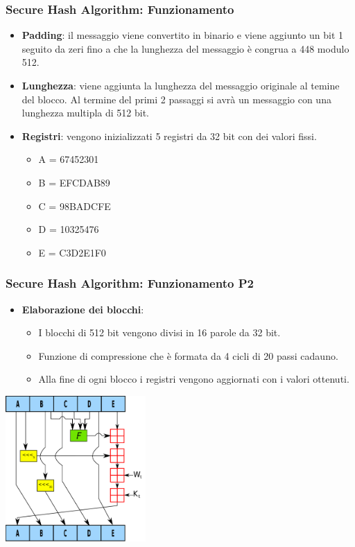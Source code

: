 \begin{frame}
\frametitle{Secure Hash Algorithm: Funzionamento}
\begin{itemize}
    \item \textbf{Padding}: il messaggio viene convertito in binario e viene aggiunto un bit 1 seguito da zeri fino a che la lunghezza del messaggio è congrua a 448 modulo 512.
    \item \textbf{Lunghezza}: viene aggiunta la lunghezza del messaggio originale al temine del blocco.
    Al termine del primi 2 passaggi si avrà un messaggio con una lunghezza multipla di 512 bit.
    \item \textbf{Registri}: vengono inizializzati 5 registri da 32 bit con dei valori fissi.
    \begin{itemize}
        \item A = 67452301
        \item B = EFCDAB89
        \item C = 98BADCFE
        \item D = 10325476
        \item E = C3D2E1F0
    \end{itemize}
\end{itemize}
\end{frame}


\begin{frame}
\frametitle{Secure Hash Algorithm: Funzionamento P2}
\begin{itemize}
    \item \textbf{Elaborazione dei blocchi}: 
    \begin{itemize}
        \item I blocchi di 512 bit vengono divisi in 16 parole da 32 bit.
        \item Funzione di compressione che è formata da 4 cicli di 20 passi cadauno.
        \item Alla fine di ogni blocco i registri vengono aggiornati con i valori ottenuti.
    \end{itemize}
\end{itemize}

\begin{center}
    \includegraphics[width=0.4\textwidth]{img/1-img/SHA-1.png}
\end{center}
\end{frame}

